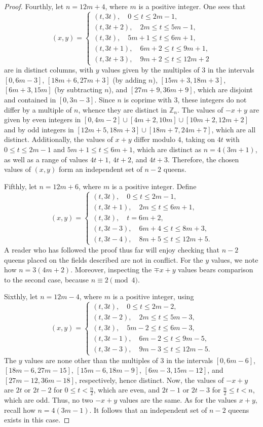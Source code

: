 \documentclass[11pt]{article}
\begin{document}
\begin{proof}
Fourthly, let $n=12m+4$, where $m$ is a positive integer. One sees that
$$(x,y)=\begin{cases} (t,3t),\quad 0\le t\le 2m-1, \\
(t,3t+2),\quad 2m\le t\le 5m-1, \\
(t,3t),\quad 5m+1\le t\le 6m+1, \\
(t,3t+1),\quad 6m+2\le t\le 9m+1, \\
(t,3t+3),\quad 9m+2\le t\le 12m+2 \end{cases}$$
are in distinct columns, with $y$ values given by the multiples of $3$ in the intervals $[0,6m-3]$, $[18m+6,27m+3]$ (by adding $n$), $[15m+3,18m+3]$, $[6m+3,15m]$ (by subtracting $n$), and $[27m+9,36m+9]$, which are disjoint and contained in $[0,3n-3]$. Since $n$ is coprime with $3$, these integers do not differ by a multiple of $n$, whence they are distinct in $\mathbb{Z}_n$. The values of $-x+y$ are given by even integers in $[0,4m-2]\cup [4m+2,10m]\cup [10m+2,12m+2]$ and by odd integers in $[12m+5,18m+3]\cup [18m+7,24m+7]$, which are all distinct. Additionally, the values of $x+y$ differ modulo $4$, taking on $4t$ with $0\le t\le 2m-1$ and $5m+1\le t\le 6m+1$, which are distinct as $n=4(3m+1)$, as well as a range of values $4t+1$, $4t+2$, and $4t+3$. Therefore, the chosen values of $(x,y)$ form an independent set of $n-2$ queens.

Fifthly, let $n=12m+6$, where $m$ is a positive integer. Define
$$(x,y)=\begin{cases} (t,3t),\quad 0\le t\le 2m-1,\\
(t,3t+1),\quad 2m\le t\le 6m+1, \\
(t,3t),\quad t=6m+2, \\
(t,3t-3),\quad 6m+4\le t\le 8m+3,\\
(t,3t-4),\quad 8m+5\le t\le 12m+5. \end{cases}$$
A reader who has followed the proof thus far will enjoy checking that $n-2$ queens placed on the fields described are not in conflict. For the $y$ values, we note how $n=3(4m+2)$. Moreover, inspecting the $\mp x+y$ values bears comparison to the second case, because $n\equiv 2\pmod 4$.

Sixthly, let $n=12m-4$, where $m$ is a positive integer, using
$$(x,y)=\begin{cases} (t,3t),\quad 0\le t\le 2m-2, \\
(t,3t-2),\quad 2m\le t\le 5m-3, \\
(t,3t),\quad 5m-2\le t\le 6m-3, \\
(t,3t-1),\quad 6m-2\le t\le 9m-5,\\
(t,3t-3),\quad 9m-3\le t\le 12m-5. \end{cases}$$
The $y$ values are none other than the multiples of $3$ in the intervals $[0,6m-6]$, $[18m-6,27m-15]$, $[15m-6,18m-9]$, $[6m-3,15m-12]$, and $[27m-12,36m-18]$, respectively, hence distinct. Now, the values of $-x+y$ are $2t$ or $2t-2$ for $0\le t<\frac n2$, which are even, and $2t-1$ or $2t-3$ for $\frac n2\le t<n$, which are odd. Thus, no two $-x+y$ values are the same. As for the values $x+y$, recall how $n=4(3m-1)$. It follows that an independent set of $n-2$ queens exists in this case.


\end{proof}
\end{document}
